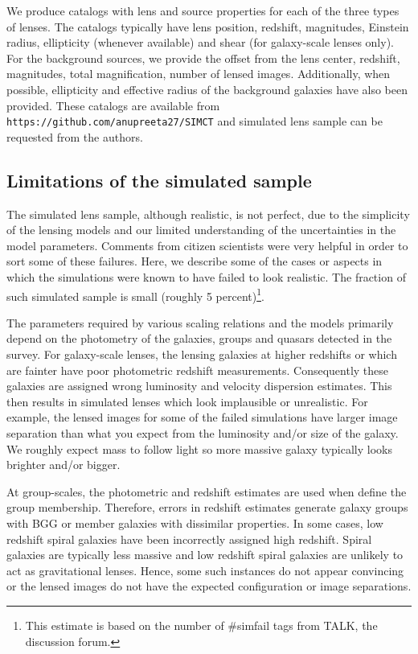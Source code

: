 \documentclass[useAMS,usenatbib,a4paper]{mn2e}
\begin{document}
We produce catalogs with lens and source properties for each of the
three types of lenses.  The catalogs typically have lens position,
redshift, magnitudes, Einstein radius, ellipticity (whenever available)
and shear (for galaxy-scale lenses only). For the background sources, we
provide the offset from the lens center, redshift, magnitudes, total
magnification, number of lensed images. Additionally, when possible,
ellipticity and effective radius of the background galaxies have also
been provided. These catalogs are available from
\texttt{https://github.com/anupreeta27/SIMCT} and simulated lens sample can be
requested from the authors.


\subsection{Limitations of the simulated sample}
The simulated lens sample, although realistic, is not perfect, due to
the simplicity of the lensing models and our limited understanding of
the uncertainties in the model parameters. Comments from citizen
scientists were very helpful in order to sort some of these failures.
Here, we describe some of the cases or aspects in which the simulations
were known to have failed to look realistic. The fraction of such
simulated sample is small (roughly 5 percent)\footnote{This estimate is
based on the number of \#simfail tags from TALK, the discussion forum.}.

The parameters required by various scaling relations and the models
primarily depend on the photometry of the galaxies, groups and quasars
detected in the survey. For galaxy-scale lenses, the lensing galaxies at
higher redshifts or which are fainter have poor photometric redshift
measurements. Consequently these galaxies are assigned  wrong
luminosity and velocity dispersion estimates. This then results in
simulated lenses which look implausible or unrealistic.  For example,
the lensed images for some of the failed simulations have larger image
separation than what you expect from the luminosity and/or size of the
galaxy. We roughly expect mass to follow light so more massive galaxy
typically looks brighter and/or bigger.

At group-scales, the photometric and redshift estimates are used when define
the group membership. Therefore, errors in redshift estimates generate galaxy
groups with BGG or member galaxies with dissimilar properties. In some cases,
low redshift spiral galaxies have been incorrectly assigned high redshift.
Spiral galaxies are typically less massive and low redshift spiral galaxies are
unlikely to act as gravitational lenses. Hence, some such instances
do not appear convincing or the lensed images do not have the expected
configuration or image separations.
\end{document}
